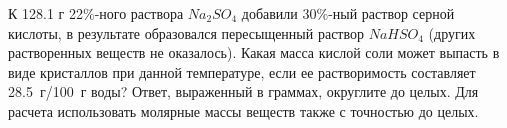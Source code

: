 
К 128.1 г 22$\%$-ного раствора $Na_2SO_4$ добавили 30$\%$-ный
раствор серной кислоты, в результате образовался пересыщенный раствор $NaHSO_4$ (других
растворенных веществ не оказалось). Какая масса кислой соли может выпасть в
виде кристаллов при данной температуре, если ее растворимость составляет
28.5~г/100~г воды? Ответ, выраженный в граммах, округлите до целых. Для расчета
использовать молярные массы веществ также с точностью до целых.



